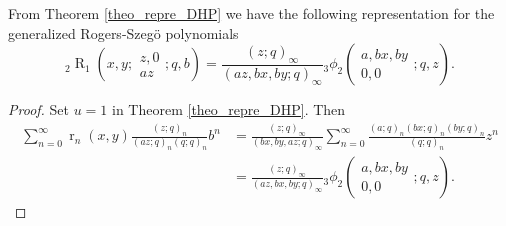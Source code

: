 \documentclass{cimart}
\DeclareMathOperator{\opR}{R}
\DeclareMathOperator{\opr}{r}
\begin{document}
\begin{corollary}
From  Theorem \ref{theo_repre_DHP} we have the following representation for the generalized Rogers-Szeg\"o polynomials
    \begin{equation}
        {}_{2}\opR_{1}\left(x,y;
        \begin{array}{c}
             z,0 \\
             az
        \end{array};
        q,b
        \right)=\frac{(z;q)_{\infty}}{(az,bx,by;q)_{\infty}}{}_{3}\phi_{2}\left(
        \begin{array}{c}
             a,bx,by \\
             0,0
        \end{array};
        q, z
        \right).
    \end{equation}
\end{corollary}
\begin{proof}
Set $u=1$ in Theorem \ref{theo_repre_DHP}. Then
    \begin{align*}
        \sum_{n=0}^{\infty}\opr_{n}(x,y)\frac{(z;q)_{n}}{(az;q)_{n}(q;q)_{n}}b^n&=\frac{(z;q)_{\infty}}{(bx,by,az;q)_{\infty}}\sum_{n=0}^{\infty}\frac{(a;q)_{n}(bx;q)_{n}(by;q)_{n}}{(q;q)_{n}}z^n\\
        &=\frac{(z;q)_{\infty}}{(az,bx,by;q)_{\infty}}{}_{3}\phi_{2}\left(
        \begin{array}{c}
             a,bx,by \\
             0,0
        \end{array};
        q, z
        \right).
    \end{align*}
\end{proof}
\end{document}
